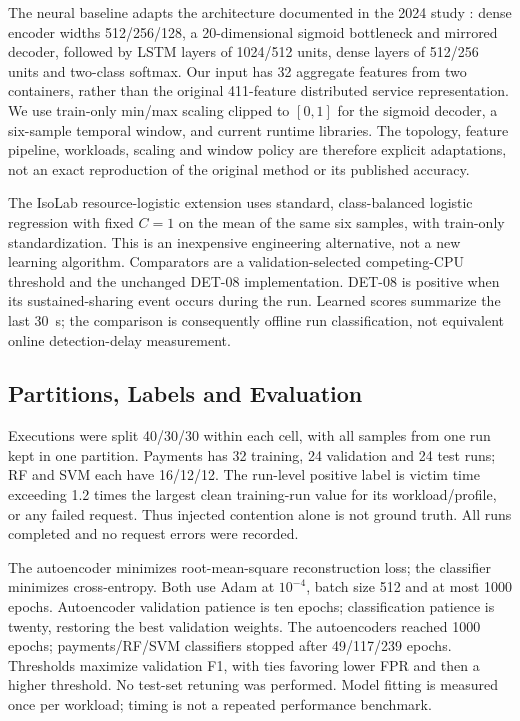 The neural baseline adapts the architecture documented in the 2024 study
\cite{qos2024}: dense encoder widths 512/256/128, a 20-dimensional sigmoid
bottleneck and mirrored decoder, followed by LSTM layers of 1024/512 units,
dense layers of 512/256 units and two-class softmax. Our input has 32 aggregate
features from two containers, rather than the original 411-feature distributed
service representation. We use train-only min/max scaling clipped to $[0,1]$
for the sigmoid decoder, a six-sample temporal window, and current runtime
libraries. The topology, feature pipeline, workloads, scaling and window policy
are therefore explicit adaptations, not an exact reproduction of the original
method or its published accuracy.

The IsoLab resource-logistic extension uses standard, class-balanced logistic
regression with fixed $C=1$ on the mean of the same six samples, with train-only
standardization. This is an inexpensive engineering alternative, not a new
learning algorithm. Comparators are a validation-selected competing-CPU
threshold and the unchanged DET-08 implementation. DET-08 is positive when its
sustained-sharing event occurs during the run. Learned scores summarize the
last 30~s; the comparison is consequently offline run classification, not
equivalent online detection-delay measurement.

\subsection{Partitions, Labels and Evaluation}
Executions were split 40/30/30 within each cell, with all samples from one run
kept in one partition. Payments has 32 training, 24 validation and 24 test runs;
RF and SVM each have 16/12/12. The run-level positive label is victim time
exceeding 1.2 times the largest clean training-run value for its workload/profile,
or any failed request. Thus injected contention alone is not ground truth.
All runs completed and no request errors were recorded.

The autoencoder minimizes root-mean-square reconstruction loss; the classifier
minimizes cross-entropy. Both use Adam at $10^{-4}$, batch size 512 and at most
1000 epochs. Autoencoder validation patience is ten epochs; classification
patience is twenty, restoring the best validation weights. The autoencoders
reached 1000 epochs; payments/RF/SVM classifiers stopped after 49/117/239 epochs.
Thresholds maximize validation F1, with ties favoring lower FPR and then a
higher threshold. No test-set retuning was performed. Model fitting is measured
once per workload; timing is not a repeated performance benchmark.

